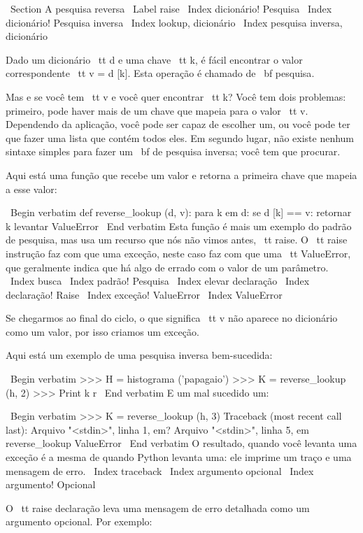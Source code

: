 \documentclass[10pt]{book}
\begin{document}
\begin {itemize}
{{{{{{{\ Section {A pesquisa reversa}
\ Label {} raise
\ Index {dicionário! Pesquisa}
\ Index {dicionário! Pesquisa inversa}
\ Index {lookup, dicionário}
\ Index {pesquisa inversa, dicionário}

Dado um dicionário {\ tt d} e uma chave {\ tt k}, é fácil
encontrar o valor correspondente {\ tt v = d [k]}. Esta operação
é chamado de {\ bf pesquisa}.

Mas e se você tem {\ tt v} e você quer encontrar {\ tt k}?
Você tem dois problemas: primeiro, pode haver mais de um
chave que mapeia para o valor {\ tt v}. Dependendo da aplicação,
você pode ser capaz de escolher um, ou você pode ter que fazer
uma lista que contém todos eles. Em segundo lugar, não existe nenhum
sintaxe simples para fazer um {\ bf de pesquisa inversa}; você tem que procurar.

Aqui está uma função que recebe um valor e retorna a primeira
chave que mapeia a esse valor:

\ Begin {verbatim}
def reverse_lookup (d, v):
    para k em d:
        se d [k] == v:
            retornar k
    levantar ValueError
\ End {verbatim}
%
Esta função é mais um exemplo do padrão de pesquisa, mas
usa um recurso que nós não vimos antes, {\ tt raise}. O {\ tt raise}
instrução faz com que uma exceção, neste caso faz com que uma {\ tt
  ValueError}, que geralmente indica que há algo de errado
com o valor de um parâmetro.
\ Index {busca}
\ Index {padrão! Pesquisa}
\ Index {elevar declaração}
\ Index {declaração! Raise}
\ Index {exceção! ValueError}
\ Index {} ValueError

Se chegarmos ao final do ciclo, o que significa {\ tt v}
não aparece no dicionário como um valor, por isso criamos um
exceção.

Aqui está um exemplo de uma pesquisa inversa bem-sucedida:

\ Begin {verbatim}
>>> H = histograma ('papagaio')
>>> K = reverse_lookup (h, 2)
>>> Print k
r
\ End {verbatim}
%
E um mal sucedido um:

\ Begin {verbatim}
>>> K = reverse_lookup (h, 3)
Traceback (most recent call last):
  Arquivo "<stdin>", linha 1, em?
  Arquivo "<stdin>", linha 5, em reverse_lookup
ValueError
\ End {verbatim}
%
O resultado, quando você levanta uma exceção é a mesma de quando
Python levanta uma: ele imprime um traço e uma mensagem de erro.
\ Index {} traceback
\ Index {argumento opcional}
\ Index {argumento! Opcional}

O {\ tt raise} declaração leva uma mensagem de erro detalhada como um
argumento opcional. Por exemplo:

}}}}}}}
\end{itemize}
\end{document}
